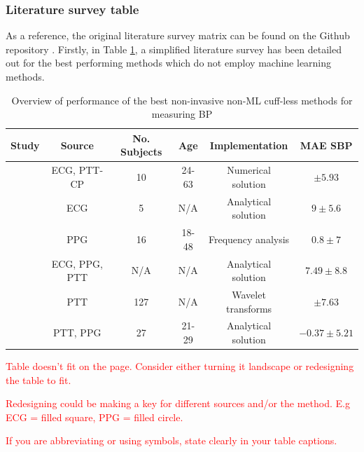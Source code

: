 \subsubsection{Literature survey table}
As a reference, the original literature survey matrix can be found on 
the Github repository \cite{LitSurvey}. Firstly, in 
Table \ref{litsurveytab}, a simplified literature survey has 
been detailed out for the best performing methods which do not 
employ machine learning methods. 
\begin{table}[H]
\caption{Overview of performance of the best non-invasive non-ML cuff-less methods for measuring BP}
\begin{tabular}{|c|c|c|c|c|c|}
\hline
\textbf{Study} & \textbf{Source} & \textbf{No. Subjects} & \textbf{Age} & \textbf{Implementation} & \textbf{MAE SBP} \\ \hline
\cite{Ahmad2012} & ECG, PTT-CP & 10 & 24-63 & Numerical solution & $\pm 5.93$ \\
\cite{Chen2013} & ECG & 5 & N/A & Analytical solution &  $9 \pm 5.6$\\
\cite{Daimiwal2014} & PPG & 16 & 18-48 & Frequency analysis &  $0.8 \pm  7$\\
\cite{Chan2001} & ECG, PPG, PTT & N/A & N/A & Analytical solution &  $7.49 \pm  8.8$\\
\cite{Yamanaka2016} & PTT & 127 & N/A & Wavelet transforms &  $\pm 7.63$\\
\cite{Ding2016} & PTT, PPG & 27 & 21-29 & Analytical solution &  $-0.37 \pm  5.21$\\ \hline
\end{tabular}
\label{litsurveytab}
\end{table}

\textcolor{red}{Table doesn't fit on the page. Consider either turning it landscape or redesigning the table to fit.}

\textcolor{red}{Redesigning could be making a key for different sources and/or the method. E.g ECG = filled square, PPG = filled circle.}

\textcolor{red}{If you are abbreviating or using symbols, state clearly in your table captions.}

